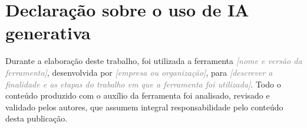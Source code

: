 %
%

\section*{Declaração sobre o uso de IA generativa}
\label{sec:declaracao-uso-ia}


Durante a elaboração deste trabalho, foi utilizada a ferramenta
\textit{\textcolor{gray}{[nome e versão da ferramenta]}}, desenvolvida por
\textit{\textcolor{gray}{[empresa ou organização]}}, para \textit{\textcolor{gray}{[descrever a finalidade e as
etapas do trabalho em que a ferramenta foi utilizada]}}. Todo o conteúdo
produzido com o auxílio da ferramenta foi analisado, revisado e validado pelos
autores, que assumem integral responsabilidade pelo conteúdo desta publicação.

